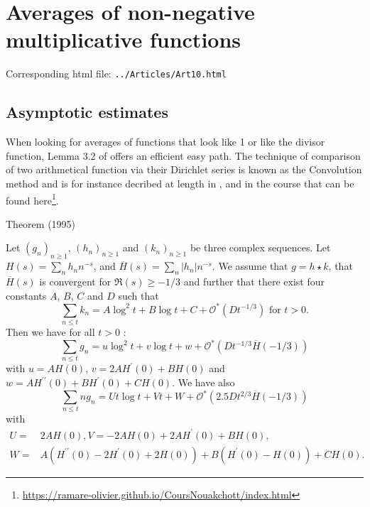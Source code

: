 \chapter{   Averages of non-negative multiplicative functions}

Corresponding html file: \texttt{../Articles/Art10.html}










 
 





\section{Asymptotic estimates}


When looking for averages of functions that look like 1 or like the divisor
function, Lemma 3.2 of
\cite{Ramare*95} offers an
efficient easy path. The technique of comparison of two arithmetical function
via their Dirichlet series is known as the Convolution method and is for
instance decribed at length in 
\cite{Berment-Ramare*12}, and in
the course that can be found 
here\footnote{\url{https://ramare-olivier.github.io/CoursNouakchott/index.html}}.


\begin{thm}{Theorem (1995)}

Let $(g_n)_{n\ge1}$, $(h_n)_{n\ge1}$ and $(k_n)_{n\ge1}$ be three
complex sequences. Let $H(s)=\sum_nh_nn^{-s}$, and
$\overline{H}(s)=\sum_n|h_n|n^{-s}$.
We assume that $g=h\star k$, that $\overline{H}(s)$ is convergent for
$\Re(s)\ge-1/3$ and further that
there exist four constants $A$, $B$, $C$ and $D$ such that
$$
\sum_{n\le t}k_n
=
A\log^2t+B\log t+C+\mathcal{O}^*(D t^{-1/3})
\text{ for $t>0$.}
$$
Then we have for all $t>0$ :
$$
\sum_{n\le t}g_n
=
u\log^2t+v\log t+w+\mathcal{O}^*(D t^{-1/3}\overline{H}(-1/3))
$$
with
$u=AH(0)$, $v=2AH^{\prime}(0)+BH(0)$ and $w=AH^{\prime\prime}(0)+BH^{\prime}(0)+CH(0)$.
We have also
$$
\sum_{n\le t}ng_n
=
Ut\log t+Vt+W+\mathcal{O}^*(2.5D t^{2/3}\overline{H}(-1/3))
$$
with
$$
\begin{aligned}
U=&2AH(0), V=-2AH(0)+2AH^{\prime}(0)+BH(0),\\
W=&A(H^{\prime\prime}(0)-2H^{\prime}(0)+2H(0))+B(H^{\prime}(0)-H(0))+CH(0).
\end{aligned}
$$
\end{thm}

